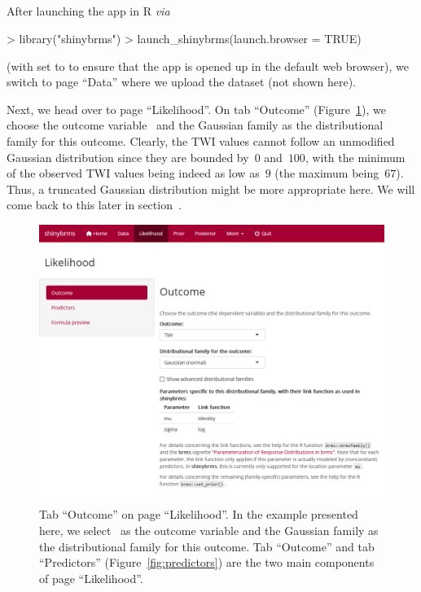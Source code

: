 \subsection[shinybrms]{}
\label{exmpl-shinybrms}

After launching the  app in R \textit{via}
\begin{example}
> library("shinybrms")
> launch_shinybrms(launch.browser = TRUE)
\end{example}
(with  set to  to ensure that the app is
opened up in the default web browser),
we switch to page ``Data'' where we upload the dataset (not shown here).

Next, we head over to page ``Likelihood''. On tab ``Outcome''
(Figure~\ref{fig:outcome}), we choose the outcome variable~ and the
Gaussian family as the distributional family for this outcome. Clearly, the
TWI values cannot follow an unmodified Gaussian distribution since they
are bounded by~$0$ and~$100$, with the minimum of the observed TWI
values being indeed as low as~$9$ (the maximum being~$67$). Thus, a truncated
Gaussian distribution might be more appropriate here. We will come back to
this later in section~.
\begin{figure}[t!]
  \centering
  \includegraphics[width=\textwidth]{Figures/Likelihood_Outcome.png}
  \caption[Tab ``Outcome'']{Tab ``Outcome'' on page ``Likelihood''.
  In the example presented here, we select~ as the outcome variable and the
  Gaussian family as the distributional family for this outcome.
  Tab ``Outcome'' and tab ``Predictors'' (Figure~\ref{fig:predictors}) are the two
  main components of page ``Likelihood''.}
  \label{fig:outcome}
\end{figure}%

